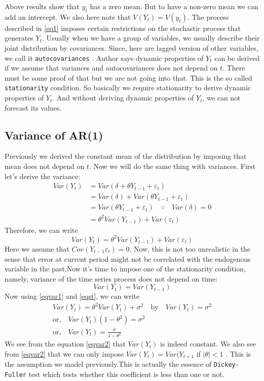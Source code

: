 \documentclass{book}
\begin{document}
Above results show that $y_t$ has a zero mean. But to have a non-zero mean we can add an intercept. We also here note that $V(Y_t)=V(y_t)$. The process described in \eqref{eq1} imposes certain restrictions on the stochastic process that generates $Y_t$. Usually when we have a group of variables, we usually describe their joint distribution by  covariances. Since, here are lagged version of other variables, we call it \texttt{autocovariances} . Author says dynamic properties of $Y_t$ can be derived if we assume that variances and autocovariances does not depend on $t$. There must be some proof of that but we are not going into that. This is the so called \texttt{stationarity} condition. So basically we require stationarity to derive dynamic properties of $Y_t$. And without deriving dynamic properties of $Y_t$, we can not forecast its values. 
\subsection{Variance of AR(1)}
Previously we derived the constant mean of the distribution by imposing that mean does not depend on $t$. Now we will do the same thing with variances. First let's derive the variance:
\begin{equation*}
	\begin{split}
		Var(Y_t)&=Var(\delta+\theta Y_{t-1}+\varepsilon_t)\\
		 &=Var(\delta)+Var(\theta Y_{t-1}+\varepsilon_t) \\
		&=Var(\theta Y_{t-1}+\varepsilon_t) \quad \because \quad Var(\delta)=0\\
		&=\theta^2 Var(Y_{t-1})+Var(\varepsilon_t) 
	\end{split}
\end{equation*}
Therefore, we can write  
	\begin{equation}\label{eqvar1}
		Var(Y_t)=\theta^2 Var(Y_{t-1})+Var(\varepsilon_t) 	
	\end{equation}
Here we assume that $Cov(Y_{t-1} \varepsilon_t)=0$. Now, this is not too unrealistic in the sense that error at current period might not be correlated with the endogenous variable in the past.Now it's time to impose one of the stationarity condition, namely, variance of the time series process does not depend on time:
	\begin{equation}\label{eqst}
		Var(Y_t)=Var(Y_{t-1})
	\end{equation}
	Now using \eqref{eqvar1} and \eqref{eqst}, we can write 
	\begin{gather}
		Var(Y_t) =\theta^2 Var(Y_t)+ \sigma^2 \quad \text{by} \quad Var(Y_t)=\sigma^2\\
		\text{or,} \quad Var(Y_t)(1-\theta^2) =\sigma^2\\
		\text{or,} \quad Var(Y_t) =\frac{\sigma}{1-\theta^2} \label{eqvar2}
	\end{gather}
	We see from the equation \eqref{eqvar2} that $Var(Y_t)$ is indeed constant. We also see from \eqref{eqvar2} that we can only impose $Var(Y_t)=Var(Y_{t+1}$ if $|\theta|<1$ . This is the assumption we madel previously.This is actually the essence of \texttt{Dickey-Fuller} test which tests whether this coefficient is less than one or not. 
\end{document}
